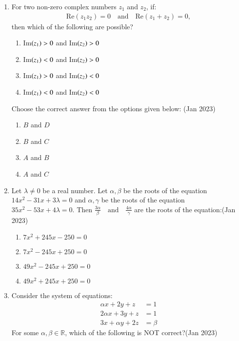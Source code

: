 \documentclass[journal,12pt,onecolumn]{IEEEtran}
\theoremstyle{remark}
\begin{document}
\begin{enumerate}
\item For two non-zero complex numbers  $z_1 $ and $z_2$, if:
\begin{align*}
   \text{Re}(z_1 z_2) = 0 \quad \text{and} \quad \text{Re}(z_1 + z_2) = 0,
\end{align*}
then which of the following are possible?
   \begin{enumerate}
       \item Im$\left(z_1\right) > 0$ and Im$\left(z_2\right) > 0$
       \item Im$\left(z_1\right) < 0$ and Im$\left(z_2\right) > 0$
      \item Im$\left(z_1\right) > 0$ and Im$\left(z_2\right) < 0$
      \item Im$\left(z_1\right) < 0$ and Im$\left(z_2\right) < 0$
   \end{enumerate}
   Choose the correct answer from the options given below: \hfill(Jan 2023)
\begin{multicols}{4}
   \begin{enumerate}
       \item $B$ and $D$
       \item $B$ and $C$
       \item $A$ and $B$
       \item $A$ and $C$
   \end{enumerate}
\end{multicols}
\item Let $\lambda \neq 0$ be a real number. Let $\alpha, \beta$ be the roots of the equation $ 14x^2 - 31x + 3\lambda = 0 $ and $\alpha, \gamma $ be the roots of the equation $ 35x^2 - 53x + 4\lambda = 0.$ Then 
$ \frac{3\alpha}{\beta} \quad \text{and} \quad \frac{4\alpha}{\gamma} $ 
are the roots of the equation:\hfill(Jan 2023)
\begin{multicols}{2}
\begin{enumerate}
    \item $ 7x^2 + 245x - 250 = 0$
    \item $ 7x^2 - 245x + 250 = 0$
    \item $ 49x^2 - 245x + 250 = 0$
    \item $ 49x^2 + 245x + 250 = 0 $
\end{enumerate}
\end{multicols}
\item Consider the system of equations:
   \begin{align*}
   \alpha x + 2y + z &= 1 \\
   2\alpha x + 3y + z &= 1 \\
   3x + \alpha y + 2z &= \beta
   \end{align*}
   For some \( \alpha, \beta \in \mathbb{R} \), which of the following is NOT correct?\hfill(Jan 2023)


\end{enumerate}
\end{document}
